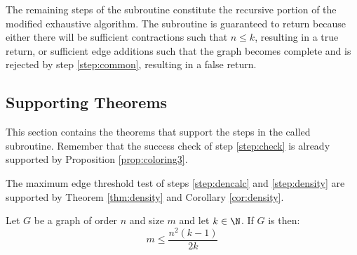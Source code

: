 The remaining steps of the subroutine constitute the recursive portion of the modified exhaustive algorithm.  The
subroutine is guaranteed to return because either there will be sufficient contractions such that \(n\le k\),
resulting in a true return, or sufficient edge additions such that the graph becomes complete and is rejected by
step \ref{step:common}, resulting in a false return.

\clearpage

\subsection{Supporting Theorems}

This section contains the theorems that support the steps in the called subroutine.  Remember that the success check
of step \ref{step:check} is already supported by Proposition \ref{prop:coloring3}.

The maximum edge threshold test of steps \ref{step:dencalc} and \ref{step:density} are supported by Theorem
\ref{thm:density} and Corollary \ref{cor:density}.

\begin{theorem}
  \label{thm:density}
  Let \(G\) be a graph of order \(n\) and size \(m\) and let \(k\in\N\).  If \(G\) is  then:
  \[m\le\frac{n^2(k-1)}{2k}\]
\end{theorem}

